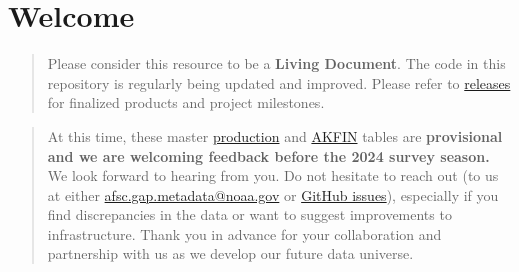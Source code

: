 \documentclass[
  letterpaper,
  oneside,
  open=any]{scrbook}
\renewcommand*\contentsname{Table of contents}
\newcommand\contentsname{Table of contents}
\begin{document}
\begin{frontmatter}
\begin{titlepage}
\begin{minipage}[b][\textheight][s]{\minipagewidth}
\titleblock

\authorblock

\affiliationblock

\vfill

\logoblock

\footerblock
\par

\end{minipage}
\clearpage
\restoregeometry
\end{titlepage}
\setcounter{page}{1}
\end{frontmatter}


\renewcommand*\contentsname{Table of contents}
{
\setcounter{tocdepth}{1}
\tableofcontents
}
\listoffigures
\listoftables
\mainmatter
\part{Welcome}

\begin{quote}
Please consider this resource to be a \textbf{Living Document}. The code
in this repository is regularly being updated and improved. Please refer
to
\href{\%60r\%20paste0(link_repo,\%20\textquotesingle{}/releases\textquotesingle{})}{releases}
for finalized products and project milestones.
\end{quote}

\begin{quote}
At this time, these master
\href{https://afsc-gap-products.github.io/gap_products/content/product-intro.html}{production}
and
\href{https://afsc-gap-products.github.io/gap_products/content/akfin-intro.html}{AKFIN}
tables are \textbf{provisional and we are welcoming feedback before the
2024 survey season.} We look forward to hearing from you. Do not
hesitate to reach out (to us at either \url{afsc.gap.metadata@noaa.gov}
or
\href{https://github.com/afsc-gap-products/gap_products/issues}{GitHub
issues}), especially if you find discrepancies in the data or want to
suggest improvements to infrastructure. Thank you in advance for your
collaboration and partnership with us as we develop our future data
universe.
\end{quote}
\end{document}
